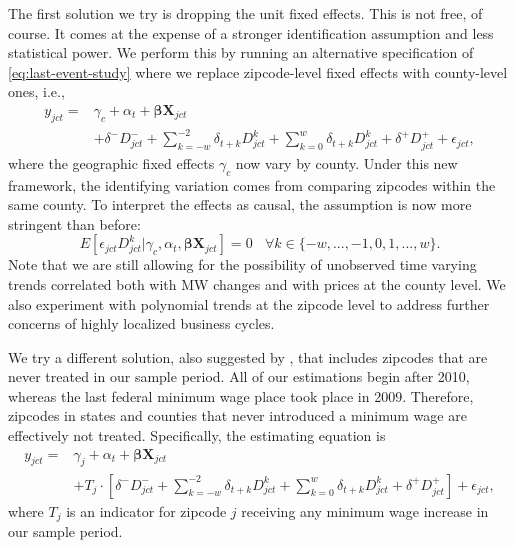     The first solution we try is dropping the unit fixed effects. This is not free, of course. It comes at the expense of a stronger identification assumption and less statistical power. We perform this by running an alternative specification of \eqref{eq:last-event-study} where we replace zipcode-level fixed effects with county-level ones, i.e.,
    \begin{equation*}\label{eq:last-event-study-countyFE}
        \begin{split}
            y_{jct} = & \gamma_{c} + \alpha_{t} + \boldsymbol{\beta} \boldsymbol{X}_{jct} \\
            & + \delta^{-} D_{jct}^{-} + \sum\limits_{k = -w}^{-2}\delta_{t + k}D_{jct}^k + \sum\limits_{k = 0}^{w}\delta_{t + k} D_{jct}^k + \delta^{+} D_{jct}^{+} + \epsilon_{jct} ,
        \end{split}   
    \end{equation*}
    where the geographic fixed effects $\gamma_{c}$ now vary by county. Under this new framework, the identifying variation comes from comparing zipcodes within the same county. To interpret the effects as causal, the assumption is now more stringent than before: $$E \left[ \epsilon_{jct} D_{jct}^k | \gamma_c, \alpha_{t}, \boldsymbol{\beta} \boldsymbol{X}_{jct}\right]  = 0 \  \ \ \ \forall k\in\{-w, ..., -1, 0, 1, ..., w\} .$$ Note that we are still allowing for the possibility of unobserved time varying trends correlated both with MW changes and with prices at the county level. We also experiment with polynomial trends at the zipcode level to address further concerns of highly localized business cycles.
    
    We try a different solution, also suggested by \textcite{borusyak2017revisiting}, that includes zipcodes that are never treated in our sample period. All of our estimations begin after 2010, whereas the last federal minimum wage place took place in 2009. Therefore, zipcodes in states and counties that never introduced a minimum wage are effectively not treated. Specifically, the estimating equation is
    \begin{equation*}\label{eq:last-event-study-control}
        \begin{split}
            y_{jct} = & \gamma_{j} + \alpha_{t} + \boldsymbol{\beta} \boldsymbol{X}_{jct} \\
            & + T_j\cdot\left[\delta^{-} D_{jct}^{-} + \sum\limits_{k = -w}^{-2}\delta_{t + k}D_{jct}^k + \sum\limits_{k = 0}^{w}\delta_{t + k} D_{jct}^k + \delta^{+} D_{jct}^{+}\right] + \epsilon_{jct} , 
        \end{split}   
    \end{equation*}
    where $T_j$ is an indicator for zipcode $j$ receiving any minimum wage increase in our sample period.
    
